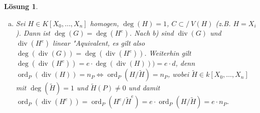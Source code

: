 \documentclass[a4paper, 12pt, numbers=noendperiod, chapterprefix=true]{scrbook}
\theoremstyle{break}
\newtheorem{Loes}{L\"osung}
\theoremstyle{nonumberbreak}
\theoremstyle{nonumberplain}
\newcommand{\quot}[1]{\textrm{\glqq}{#1}\textrm{\grqq}}
\newcommand{\isom}{\cong}
\DeclareMathOperator{\id}{id}
\DeclareMathOperator{\Quot}{Quot}
\DeclareMathOperator{\Divisor}{div}
\DeclareMathOperator{\ord}{ord}
\newcommand{\A}{\mathbb{A}}
\newcommand{\Affine}{\mathbb{A}} %
\DeclareMathOperator{\Projective}{\mathbb{P}} %
\newcommand{\nsubset}{\subset\!\!\!\!\!/~}
\begin{document}
\begin{Loes}
\begin{enumerate}[a)]
	Aus Behauptung 1 und 2 folgt dann wie gew"unscht 
		\[d = \deg(\Divisor(X)) = \deg(h^\ast((0:1))) = \sum_{h(P) = (0:1)} e_P(h) = \deg h = \deg F \, .\]

	\emph{Beweis Beh. 2:} Nach Definition gilt $\deg h = [k(C) : k(\Projective^1(k))]$. Betrachte die Einschr"ankung $h^a$ von $h$ auf $C^a = C \cap D(Y)$ nach $\Projective^1(k) \cap D(Y) = \Affine^1(k)$. Der Morphismus $h^a: C^a \to \Affine^1(k), (x:1:z) \mapsto x$ induziert einen Morphismus $(h^a)^\sharp: k(\Affine^1(k)) = k(X) \hookrightarrow k(C^a) = k(x,z), X \mapsto x$, wobei $x$ und $z$ die Restklassen von $X$ und $Z$ in $k[C^a]$ bezeichnen. 
 
	Das Bild von $(h^a)^\sharp$ ist $k(x)$ und f"ur $z$ gilt $F(x,1,z) = 0$. Sei $m$ der Grad von $F$ und $F = \sum_{i+j+k=m} a_{ijk} X^i Y^j Z ^k$. Wegen $(0:0:1) \notin C$ ist $a_{00m} \neq 0$ und die Dehomogenisierung von $F$ nach $Y$, $f := F(X,1,Z)$, hat Grad $m$ in $Z$. Da $F$ irreduzibel in $k[X,Y,Z]$ ist, ist auch $f$ irreduzibel in $k[X,Z]$. Eine einfache Folgerung aus dem Lemma von Gau\ss \footnote{siehe Hilfssatz 2.2.6 in \quot{Algebra im WS 2011/2012} von Dr. Stefan K"uhnlein} sagt, dass dann $f$ auch "uber $k(X)[Z]$ irreduzibel ist. Wegen $C^a = V(f)$, gilt $k(C^a) = \Quot(k[X,Z]/(f)) \isom k(X)[Z] / (f)$ und somit $\deg h^a  = [k(C^a) : k(X)] = \deg f $.
	
	Die Inklusion $C^a \hookrightarrow C$ hat eine dominante rationale Umkehrabbildung $\id \colon C \dashrightarrow C^a$. Daher ist $k(C^a ) \isom k(C)$. Genauso ist auch $k(\Projective^1(k)) \isom k(\Affine^1(k))$ und es folgt $\deg h = [k(C) : k(\Projective^1(k))] = [k(C^a) : k(\Affine^1(k))] = \deg h^a$. Insgesamt gilt $\deg F = \deg f = \deg h^a = \deg h$.
\item
	Sei $H \in K[X_0, \dots, X_n]$ homogen, $\deg(H) = 1$, $C \nsubset V(H)$ (z.B. $H = X_i$). Dann ist $\deg(G) = \deg(H^e)$. Nach b) sind $\Divisor(G)$ und $\Divisor(H^e)$ linear "Aquivalent, es gilt also $\deg(\Divisor(G)) = \deg(\Divisor(H^e))$. Weiterhin gilt $\deg(\Divisor(H^e)) = e \cdot \deg(\Divisor(H))) = e \cdot d$, denn $\ord_P(\Divisor(H)) = n_P \Leftrightarrow \ord_P(H / \tilde{H}) = n_P$, wobei $\tilde{H} \in k[X_0, \dots, X_n]$ mit $\deg(\tilde{H}) = 1$ und $\tilde{H}(P) \neq 0$ und damit $\ord_P(\Divisor(H^e)) = \ord_P(H^e / \tilde{H}^e) = e \cdot \ord_P(H / \tilde{H}) = e \cdot n_P$.
\end{enumerate}\end{Loes}


\end{document}
